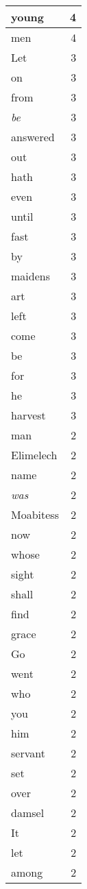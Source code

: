 \begin{center}
\begin{longtable}{l|r}
young & 4 \\ \hline
men & 4 \\ \hline
Let & 3 \\ \hline
on & 3 \\ \hline
from & 3 \\ \hline
\emph{be} & 3 \\ \hline
answered & 3 \\ \hline
out & 3 \\ \hline
hath & 3 \\ \hline
even & 3 \\ \hline
until & 3 \\ \hline
fast & 3 \\ \hline
by & 3 \\ \hline
maidens & 3 \\ \hline
art & 3 \\ \hline
left & 3 \\ \hline
come & 3 \\ \hline
be & 3 \\ \hline
for & 3 \\ \hline
he & 3 \\ \hline
harvest & 3 \\ \hline
man & 2 \\ \hline
Elimelech & 2 \\ \hline
name & 2 \\ \hline
\emph{was} & 2 \\ \hline
Moabitess & 2 \\ \hline
now & 2 \\ \hline
whose & 2 \\ \hline
sight & 2 \\ \hline
shall & 2 \\ \hline
find & 2 \\ \hline
grace & 2 \\ \hline
Go & 2 \\ \hline
went & 2 \\ \hline
who & 2 \\ \hline
you & 2 \\ \hline
him & 2 \\ \hline
servant & 2 \\ \hline
set & 2 \\ \hline
over & 2 \\ \hline
damsel & 2 \\ \hline
It & 2 \\ \hline
let & 2 \\ \hline
among & 2 \\ \hline

\end{longtable}
\end{center}
